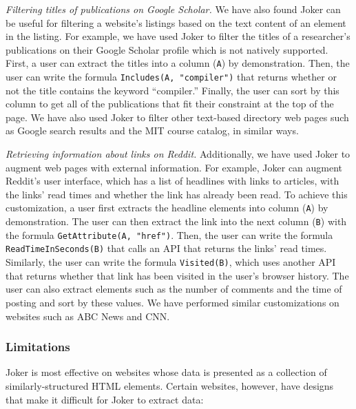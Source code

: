 \documentclass[sigconf,10pt]{acmart}
\begin{document}
\emph{Filtering titles of publications on Google Scholar.} We have also
found Joker can be useful for filtering a website's listings based on
the text content of an element in the listing. For example, we have used
Joker to filter the titles of a researcher's publications on their
Google Scholar profile which is not natively supported. First, a user
can extract the titles into a column (\texttt{A}) by demonstration.
Then, the user can write the formula \texttt{Includes(A,\ "compiler")}
that returns whether or not the title contains the keyword ``compiler.''
Finally, the user can sort by this column to get all of the publications
that fit their constraint at the top of the page. We have also used
Joker to filter other text-based directory web pages such as Google
search results and the MIT course catalog, in similar ways.

\emph{Retrieving information about links on Reddit.} Additionally, we
have used Joker to augment web pages with external information. For
example, Joker can augment Reddit's user interface, which has a list of
headlines with links to articles, with the links' read times and whether
the link has already been read. To achieve this customization, a user
first extracts the headline elements into column (\texttt{A}) by
demonstration. The user can then extract the link into the next column
(\texttt{B}) with the formula \texttt{GetAttribute(A,\ "href")}. Then,
the user can write the formula \texttt{ReadTimeInSeconds(B)} that calls
an API that returns the links' read times. Similarly, the user can write
the formula \texttt{Visited(B)}, which uses another API that returns
whether that link has been visited in the user's browser history. The
user can also extract elements such as the number of comments and the
time of posting and sort by these values. We have performed similar
customizations on websites such as ABC News and CNN.

\hypertarget{limitations}{%
\subsubsection{Limitations}\label{limitations}}

Joker is most effective on websites whose data is presented as a
collection of similarly-structured HTML elements. Certain websites,
however, have designs that make it difficult for Joker to extract data:
\end{document}
